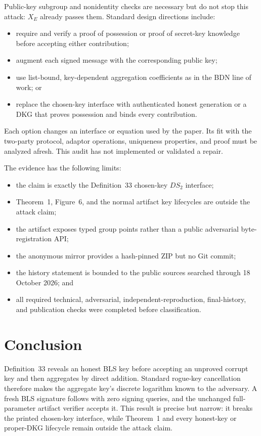\documentclass[10pt,a4paper]{article}
\begin{document}
Public-key subgroup and nonidentity checks are necessary but do not stop this
attack: $X_E$ already passes them. Standard design directions include:
\begin{itemize}
  \item require and verify a proof of possession or proof of secret-key
        knowledge before accepting either contribution;
  \item augment each signed message with the corresponding public key;
  \item use list-bound, key-dependent aggregation coefficients as in the BDN
        line of work; or
  \item replace the chosen-key interface with authenticated honest generation
        or a DKG that proves possession and binds every contribution.
\end{itemize}
Each option changes an interface or equation used by the paper. Its fit with
the two-party protocol, adaptor operations, uniqueness properties, and proof
must be analyzed afresh. This audit has not implemented or validated a repair.

The evidence has the following limits:
\begin{itemize}
  \item the claim is exactly the Definition~33 chosen-key $DS_2$ interface;
  \item Theorem~1, Figure~6, and the normal artifact key lifecycles are outside
        the attack claim;
  \item the artifact exposes typed group points rather than a public
        adversarial byte-registration API;
  \item the anonymous mirror provides a hash-pinned ZIP but no Git commit;
  \item the history statement is bounded to the public sources searched
        through 18 October 2026; and
  \item all required technical, adversarial, independent-reproduction,
        final-history, and publication checks were completed before
        classification.
\end{itemize}

\section{Conclusion}

Definition~33 reveals an honest BLS key before accepting an unproved corrupt
key and then aggregates by direct addition. Standard rogue-key cancellation
therefore makes the aggregate key's discrete logarithm known to the adversary.
A fresh BLS signature follows with zero signing queries, and the unchanged
full-parameter artifact verifier accepts it. This result is precise but
narrow: it breaks the printed chosen-key interface, while Theorem~1 and every
honest-key or proper-DKG lifecycle remain outside the attack claim.
\end{document}
